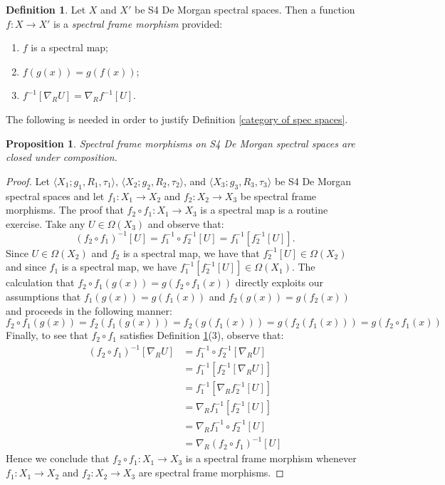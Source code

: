 \documentclass{amsart}
\theoremstyle{plain}
\newtheorem{proposition}[theorem]{Proposition}
\theoremstyle{definition}
\newtheorem{definition}[theorem]{Definition}
\begin{document}
    
\begin{definition}\label{spectral frame morphism}
    Let $X$ and $X'$ be S4 De Morgan spectral spaces. Then a function $f\colon X\to X'$ is a \emph{spectral frame morphism} provided:
    \begin{enumerate}
        \item $f$ is a spectral map; 
        \item $f(g(x))=g(f(x))$; 
        \item $f^{-1}[\nabla_RU]=\nabla_Rf^{-1}[U]$.  
    \end{enumerate}
\end{definition}
\noindent The following is needed in order to justify Definition \ref{category of spec spaces}. 
\begin{proposition}\label{composition}
    Spectral frame morphisms on S4 De Morgan spectral spaces are closed under composition. 
\end{proposition}
\begin{proof}
 Let $\langle X_1;g_1,R_1,\tau_1\rangle$, $\langle X_2;g_2,R_2,\tau_2\rangle$, and $\langle X_3;g_3,R_3,\tau_3\rangle$  be S4 De Morgan spectral spaces and let $f_1\colon X_1\to X_2$ and $f_2\colon X_2\to X_3$ be spectral frame morphisms. The proof that $f_2\circ f_1\colon X_1\to X_3$ is a spectral map is a routine exercise. Take any $U\in\Omega(X_3)$ and observe that: \[(f_2\circ f_1)^{-1}[U]=f_1^{-1}\circ f_2^{-1}[U]=f_1^{-1}[f_2^{-1}[U]].\] Since $U\in\Omega(X_2)$ and $f_2$ is a spectral map, we have that $f_2^{-1}[U]\in\Omega(X_2)$ and since $f_1$ is a spectral map, we have $f_1^{-1}[f_2^{-1}[U]]\in\Omega(X_1)$. The calculation that $f_2\circ f_1(g(x))=g(f_2\circ f_1(x))$ directly exploits our assumptions that $f_1(g(x))=g(f_1(x))$ and $f_2(g(x))=g(f_2(x))$ and proceeds in the following manner:
 \[f_2\circ f_1(g(x))=f_2(f_1(g(x)))=f_2(g(f_1(x)))=g(f_2(f_1(x)))=g(f_2\circ f_1(x))\]
 Finally, to see that $f_2\circ f_1$ satisfies Definition \ref{spectral frame morphism}(3), observe that:
 \begin{align*}
     (f_2\circ f_1)^{-1}[\nabla_RU]&=f_1^{-1}\circ f_2^{-1}[\nabla_RU]\\&=f_1^{-1}[f^{-1}_2[\nabla_RU]]\\&=f^{-1}_1[\nabla_Rf^{-1}_2[U]]\\&=\nabla_Rf^{-1}_1[f^{-1}_2[U]]\\&=\nabla_Rf^{-1}_1\circ f_2^{-1}[U]\\&=\nabla_R(f_2\circ f_1)^{-1}[U]
 \end{align*}
 Hence we conclude that $f_2\circ f_1\colon X_1\to X_3$ is a spectral frame morphism
 whenever $f_1\colon X_1\to X_2$ and $f_2\colon X_2\to X_3$ are spectral frame morphisms. 
 \end{proof}
\end{document}
